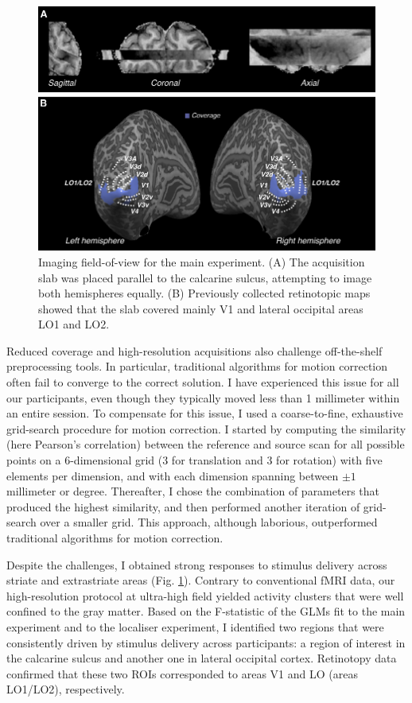 \begin{figure}
  \centering
  \includegraphics[keepaspectratio]{Fig2.pdf}
  \caption[Imaging field-of-view for the main experiment.]{Imaging field-of-view for the main experiment. (A) The acquisition slab was placed parallel to the calcarine sulcus, attempting to image both hemispheres equally. (B) Previously collected retinotopic maps showed that the slab covered mainly V1 and lateral occipital areas LO1 and LO2.}
  \label{fig:ch5fig2}
\end{figure}

Reduced coverage and high-resolution acquisitions also challenge off-the-shelf preprocessing tools. In particular, traditional algorithms for motion correction often fail to converge to the correct solution. I have experienced this issue for all our participants, even though they typically moved less than 1 millimeter within an entire session. To compensate for this issue, I used a coarse-to-fine, exhaustive grid-search procedure for motion correction. I started by computing the similarity (here Pearson's correlation) between the reference and source scan for all possible points on a 6-dimensional grid (3 for translation and 3 for rotation) with five elements per dimension, and with each dimension spanning between $\pm 1$ millimeter or degree. Thereafter, I chose the combination of parameters that produced the highest similarity, and then performed another iteration of grid-search over a smaller grid. This approach, although laborious, outperformed traditional algorithms for motion correction.

Despite the challenges, I obtained strong responses to stimulus delivery across striate and extrastriate areas (Fig. \ref{fig:ch5fig2}). Contrary to conventional fMRI data, our high-resolution protocol at ultra-high field yielded activity clusters that were well confined to the gray matter. Based on the F-statistic of the GLMs fit to the main experiment and to the localiser experiment, I identified two regions that were consistently driven by stimulus delivery across participants: a region of interest in the calcarine sulcus and another one in lateral occipital cortex. Retinotopy data confirmed that these two ROIs corresponded to areas V1 and LO (areas LO1/LO2), respectively.

